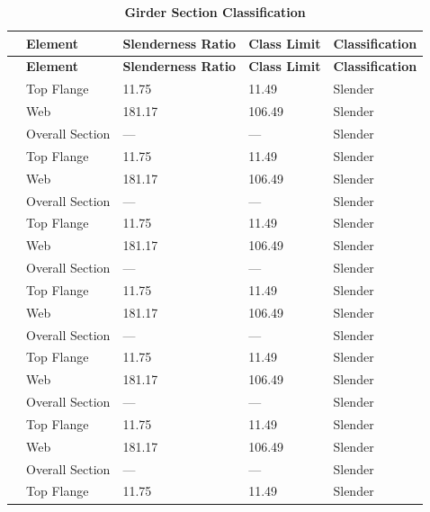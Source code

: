 \documentclass[12pt,a4paper]{report}
\numberwithin{table}{chapter}
\numberwithin{figure}{chapter}
\begin{document}
\vspace{1em}
\begin{longtable}{|C{2.5cm}|L{3cm}|C{3.5cm}|C{2.5cm}|>{\centering\arraybackslash}p{4.0cm}|}
\caption{\textbf{Girder Section Classification}}\\
\hline
\textbf{} & \textbf{Element} & \textbf{Slenderness Ratio} & \textbf{Class Limit} & \textbf{Classification} \\[6pt]
\hline
\endfirsthead
\hline
\textbf{} & \textbf{Element} & \textbf{Slenderness Ratio} & \textbf{Class Limit} & \textbf{Classification} \\[6pt]
\hline
\endhead
{} & Top Flange & 11.75 & 11.49 & Slender \\[6pt]
 & Web & 181.17 & 106.49 & Slender \\[6pt]
 & Overall Section & --- & --- & Slender \\[6pt]
\hline
{} & Top Flange & 11.75 & 11.49 & Slender \\[6pt]
 & Web & 181.17 & 106.49 & Slender \\[6pt]
 & Overall Section & --- & --- & Slender \\[6pt]
\hline
{} & Top Flange & 11.75 & 11.49 & Slender \\[6pt]
 & Web & 181.17 & 106.49 & Slender \\[6pt]
 & Overall Section & --- & --- & Slender \\[6pt]
\hline
{} & Top Flange & 11.75 & 11.49 & Slender \\[6pt]
 & Web & 181.17 & 106.49 & Slender \\[6pt]
 & Overall Section & --- & --- & Slender \\[6pt]
\hline
{} & Top Flange & 11.75 & 11.49 & Slender \\[6pt]
 & Web & 181.17 & 106.49 & Slender \\[6pt]
 & Overall Section & --- & --- & Slender \\[6pt]
\hline
{} & Top Flange & 11.75 & 11.49 & Slender \\[6pt]
 & Web & 181.17 & 106.49 & Slender \\[6pt]
 & Overall Section & --- & --- & Slender \\[6pt]
\hline
{} & Top Flange & 11.75 & 11.49 & Slender \\[6pt]

\end{longtable}
\end{document}
